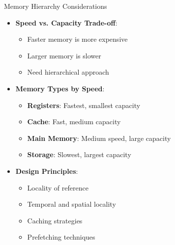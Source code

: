 \documentclass[aspectratio=169,11pt]{beamer}
\newcommand{\concept}[1]{\textbf{\color{accentcolor}#1}}
\begin{document}
\begin{frame}{Memory Hierarchy Considerations}
\begin{itemize}
\item \concept{Speed vs. Capacity Trade-off}:
\begin{itemize}
\item Faster memory is more expensive
\item Larger memory is slower
\item Need hierarchical approach
\end{itemize}
\vspace{0.5cm}
\item \concept{Memory Types by Speed}:
\begin{itemize}
\item \textbf{Registers}: Fastest, smallest capacity
\item \textbf{Cache}: Fast, medium capacity
\item \textbf{Main Memory}: Medium speed, large capacity
\item \textbf{Storage}: Slowest, largest capacity
\end{itemize}
\vspace{0.3cm}
\item \concept{Design Principles}:
\begin{itemize}
\item Locality of reference
\item Temporal and spatial locality
\item Caching strategies
\item Prefetching techniques
\end{itemize}
\end{itemize}
\end{frame}
\end{document}
